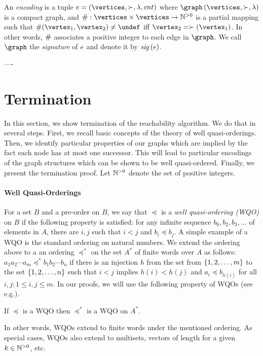 An {\it encoding} is a tuple $\encoding=\tuple{\vertices,\succ,\labeling,cnt}$ where
$\graph\tuple{\vertices,\succ,\labeling}$ is a compact graph, and
$\cnt:\vertices\times\vertices\rightarrow\pintgrs$ is a partial mapping such that
$\cnt(\vertex_1,\vertex_2)\neq\undef$ iff $\vertex_2=\succ(\vertex_1)$.
%
In other words, $\#$ associates a positive integer to each edge in $\graph$.
%
We call $\graph$ the {\it signature} of $e$ and denote it by ${\it sig}\left(e\right)$.


----
\section{Termination}
\label{termination:section}
In this section, we show termination of the reachability algorithm.
%
We do that in several steps.
%
First, we recall basic concepts of the theory of well quasi-orderings.
%
Then, we identify particular properties of our graphs which are implied by
the fact each node has at most one successor.
%
This will lead to particular encodings of the graph structures
which can be shown to be well quasi-ordered.
%
Finally, we present the termination proof.
%
Let ${\mathbb N}^{>0}$ denote the set of positive integers.

\paragraph{\bf Well Quasi-Orderings}
For a set $B$ and a pre-order on $B$, we say that $\preceq$ is 
a {\it well quasi-ordering (WQO)} on $B$ if the following property is
satisfied:
for any infinite sequence $b_0,b_2,b_3,\ldots$ of elements in $A$, there are 
$i,j$  such that $i<j$ and $b_i\preceq b_j$.
%
A simple example of a WQO is the standard ordering on natural numbers.
%
We extend the ordering above to a an ordering $\preceq^*$ on
the set $A^*$ of finite words over $A$ as follows:
$a_1 a_2\cdots a_m\preceq^* b_1 b_2\cdots b_n$ if there is an injection $h$
from the set
from $\left\{1,2,\ldots,m\right\}$ to the set $\left\{1,2,\ldots,n\right\}$ such that
$i<j$ implies $h(i)<h(j)$ and $a_i\preceq b_{h(i)}$ for all $i,j:1\leq i,j\leq m$.
%
In our proofs, we will use the following property of WQOs (see e.g.\cite{WQO}).
%
\begin{lemma}
\label{WQO:properties:lemma}
If $\preceq$ is a WQO then $\preceq^*$ is a WQO on $A^*$.
\end{lemma}
In other words, WQOs extend to finite words under the mentioned ordering.
%
As special cases, WQOs also extend to multisets, vectors of length for a given
$k\in{\mathbb N}^{>0}$, etc.
%


